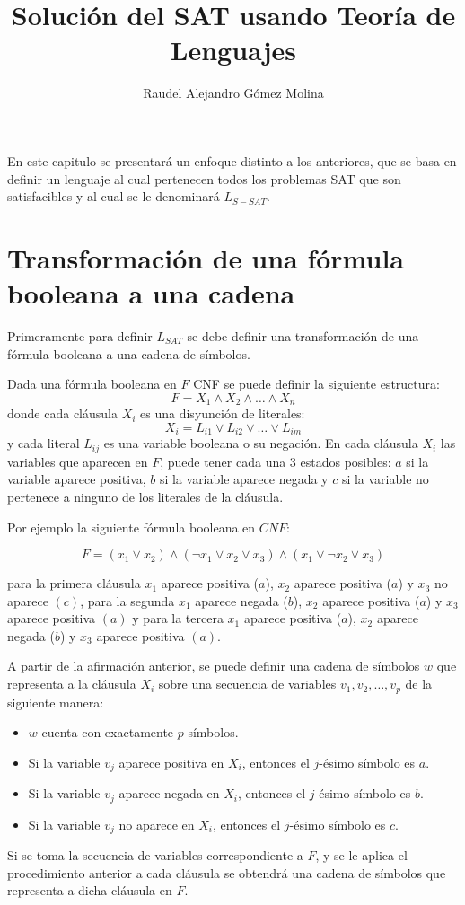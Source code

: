 \documentclass[12pt]{article}
\title{Solución del SAT usando Teoría de Lenguajes}
\author{Raudel Alejandro Gómez Molina}
\begin{document}
\maketitle

En este capitulo se presentará un enfoque distinto a los anteriores, que se basa en definir un lenguaje al cual
pertenecen todos los problemas SAT que son satisfacibles y al cual se le denominará $L_{S-SAT}$.

\section{Transformación de una fórmula booleana a una cadena}

Primeramente para definir $L_{SAT}$ se debe definir una transformación de una fórmula booleana a una cadena de 
símbolos.

Dada una fórmula booleana en $F$ CNF se puede definir la siguiente estructura:
$$F=X_1 \wedge X_2 \wedge \ldots \wedge X_n$$
donde cada cláusula $X_i$ es una disyunción de literales:
$$X_i=L_{i1} \vee L_{i2} \vee \ldots \vee L_{im}$$
y cada literal $L_{ij}$ es una variable booleana o su negación. En cada cláusula $X_i$ las variables que aparecen en $F$, puede tener cada una 3 estados posibles: $a$ si la variable aparece positiva, $b$ si la variable aparece negada y $c$ si la variable no pertenece a ninguno de los literales de la cláusula.

Por ejemplo la siguiente fórmula booleana en $CNF$:

$$F=(x_1 \vee x_2) \wedge (\neg x_1 \vee x_2 \vee x_3) \wedge (x_1 \vee \neg x_2 \vee x_3)$$

para la primera cláusula $x_1$ aparece positiva ($a$), $x_2$ aparece positiva ($a$) y $x_3$ no aparece $(c)$, para la segunda
$x_1$ aparece negada ($b$), $x_2$ aparece positiva ($a$) y $x_3$ aparece positiva $(a)$ y para la tercera 
$x_1$ aparece positiva ($a$), $x_2$ aparece negada ($b$) y $x_3$ aparece positiva $(a)$.

A partir de la afirmación anterior, se puede definir una cadena de símbolos $w$ que representa a la cláusula $X_i$ sobre una secuencia de variables $v_1,v_2,\ldots,v_p$ de la siguiente manera:

\begin{itemize}
    \item $w$ cuenta con exactamente $p$ símbolos.
    \item Si la variable $v_j$ aparece positiva en $X_i$, entonces el $j$-ésimo símbolo es $a$.
    \item Si la variable $v_j$ aparece negada en $X_i$, entonces el $j$-ésimo símbolo es $b$.
    \item Si la variable $v_j$ no aparece en $X_i$, entonces el $j$-ésimo símbolo es $c$.
\end{itemize}
Si se toma la secuencia de variables correspondiente a $F$, y se le aplica el procedimiento anterior a cada cláusula
se obtendrá una cadena de símbolos que representa a dicha cláusula en $F$.
\end{document}
